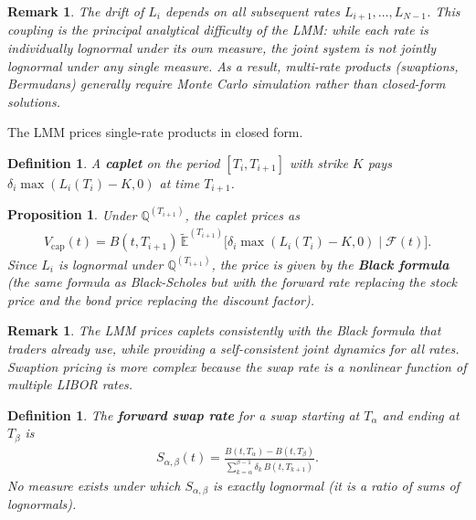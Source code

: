 \documentclass{report}
\theoremstyle{spacedplain}
\newtheorem{proposition}[theorem]{Proposition}
\theoremstyle{spaceddefinition}
\newtheorem{definition}[theorem]{Definition}
\theoremstyle{spacedremark}
\newtheorem{remark}[theorem]{Remark}
\begin{document}
\begin{remark}
The drift of $L_i$ depends on all subsequent rates $L_{i+1}, \ldots, L_{N-1}$. This coupling is the principal analytical difficulty of the LMM: while each rate is individually lognormal under its own measure, the joint system is not jointly lognormal under any single measure. As a result, multi-rate products (swaptions, Bermudans) generally require Monte Carlo simulation rather than closed-form solutions.
\end{remark}

The LMM prices single-rate products in closed form.

\begin{definition}
A \textbf{caplet} on the period $[T_i, T_{i+1}]$ with strike $K$ pays $\delta_i\max(L_i(T_i) - K, 0)$ at time $T_{i+1}$.
\end{definition}

\begin{proposition}
Under $\mathbb{Q}^{(T_{i+1})}$, the caplet prices as
\begin{align}
    V_{\text{cap}}(t) = B(t,T_{i+1})\,\widetilde{\mathbb{E}}^{(T_{i+1})}\bigl[\delta_i\max(L_i(T_i)-K,0)\;\big|\;\mathcal{F}(t)\bigr].
\end{align}
Since $L_i$ is lognormal under $\mathbb{Q}^{(T_{i+1})}$, the price is given by the \textbf{Black formula} (the same formula as Black-Scholes but with the forward rate replacing the stock price and the bond price replacing the discount factor).
\end{proposition}

\begin{remark}
The LMM prices caplets consistently with the Black formula that traders already use, while providing a self-consistent joint dynamics for all rates. Swaption pricing is more complex because the swap rate is a nonlinear function of multiple LIBOR rates.
\end{remark}

\begin{definition}
The \textbf{forward swap rate} for a swap starting at $T_\alpha$ and ending at $T_\beta$ is
\begin{align}
    S_{\alpha,\beta}(t) = \frac{B(t,T_\alpha) - B(t,T_\beta)}{\sum_{k=\alpha}^{\beta-1}\delta_k\,B(t,T_{k+1})}.
\end{align}
No measure exists under which $S_{\alpha,\beta}$ is exactly lognormal (it is a ratio of sums of lognormals).
\end{definition}
\end{document}
